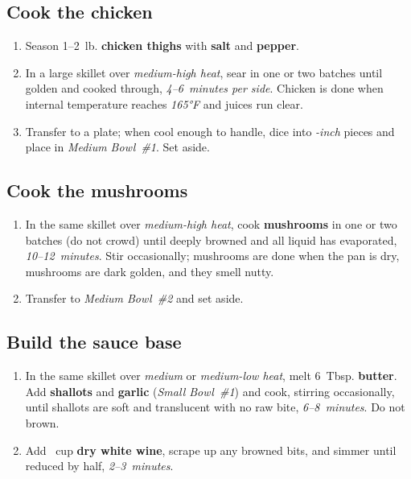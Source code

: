\documentclass[11pt,letterpaper]{article}
\begin{document}
\subsection*{Cook the chicken}
\begin{enumerate}
    \item Season 1--2~lb. \textbf{chicken thighs} with \textbf{salt} and \textbf{pepper}.
    \item In a large skillet over \textit{medium-high heat}, sear in one or two batches until golden and cooked through, \textit{4--6~minutes per side}. Chicken is done when internal temperature reaches \textit{165°F} and juices run clear.
    \item Transfer to a plate; when cool enough to handle, dice into \textit{-inch} pieces and place in \textit{Medium Bowl~\#1}. Set aside.
\end{enumerate}

\subsection*{Cook the mushrooms}
\begin{enumerate}
    \item In the same skillet over \textit{medium-high heat}, cook \textbf{mushrooms} in one or two batches (do not crowd) until deeply browned and all liquid has evaporated, \textit{10--12~minutes}. Stir occasionally; mushrooms are done when the pan is dry, mushrooms are dark golden, and they smell nutty.
    \item Transfer to \textit{Medium Bowl~\#2} and set aside.
\end{enumerate}

\subsection*{Build the sauce base}
\begin{enumerate}
    \item In the same skillet over \textit{medium} or \textit{medium-low heat}, melt 6~Tbsp. \textbf{butter}. Add \textbf{shallots} and \textbf{garlic} (\textit{Small Bowl~\#1}) and cook, stirring occasionally, until shallots are soft and translucent with no raw bite, \textit{6--8~minutes}. Do not brown.
    \item Add ~cup \textbf{dry white wine}, scrape up any browned bits, and simmer until reduced by half, \textit{2--3~minutes}.
\end{enumerate}
\end{document}
